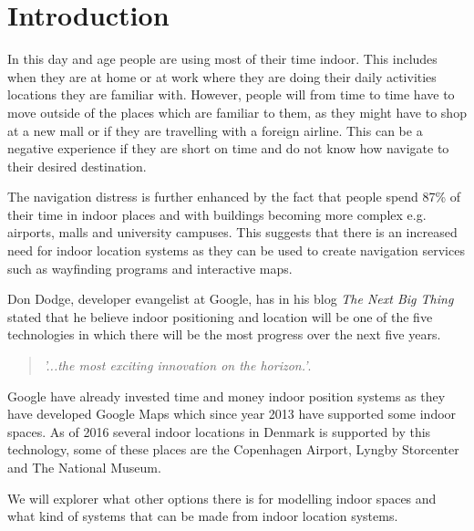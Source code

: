 \chapter{Introduction}
In this day and age people are using most of their time indoor. This includes when they are at home or at work where they are doing their daily activities locations they are familiar with. However, people will from time to time have to move outside of the places which are familiar to them, as they might have to shop at a new mall or if they are travelling with a foreign airline. This can be a negative experience if they are short on time and do not know how navigate to their desired destination. 

The navigation distress is further enhanced by the fact that people spend 87\% of their time in indoor places and with buildings becoming more complex e.g. airports, malls and university campuses. This suggests that there is an increased need for indoor location systems as they can be used to create navigation services such as wayfinding programs and interactive maps. %

Don Dodge, developer evangelist at Google, has in his blog \textit{The Next Big Thing} stated that he believe indoor positioning and location will be one of the five technologies in which there will be the most progress over the next five years\cite{DonDIndoorIsNext}.
\begin{quotation}
	\textit{'...the most exciting innovation on the horizon.'}\cite{DonDNextBigThing}.
\end{quotation}
Google have already invested time and money indoor position systems as they have developed Google Maps which since year 2013 have supported some indoor spaces\cite{google_indoor}. As of 2016 several indoor locations in Denmark is supported by this technology, some of these places are the Copenhagen Airport, Lyngby Storcenter and The National Museum\cite{google_dk}.

We will explorer what other options there is for modelling indoor spaces and what kind of systems that can be made from indoor location systems.
